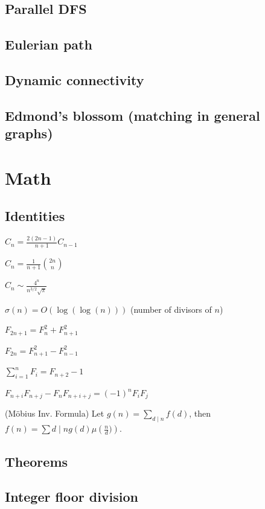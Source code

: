 \subsection{Parallel DFS}
\subsection{Eulerian path}
\subsection{Dynamic connectivity}
\subsection{Edmond's blossom (matching in general graphs)}

\section{Math}
\subsection{Identities}
{
$C_n = \frac{2(2n-1)}{n+1} C_{n-1}$

$C_n = \frac{1}{n+1} \binom{2n}{n}$

$C_n \sim \frac{4^n}{n^{3/2}\sqrt{\pi}}$

$\sigma(n) = O(\log(\log(n)))$ (number of divisors of $n$)

$F_{2n+1} = F_{n}^2 + F_{n+1}^2$

$F_{2n} = F_{n+1}^2 - F_{n-1}^2$

$\sum_{i=1}^n F_i = F_{n+2}-1$

$F_{n+i}F_{n+j} - F_nF_{n+i+j} = (-1)^n F_iF_j$

(Möbius Inv. Formula)
Let $g(n) = \sum_{d\mid n} f(d)$, then $f(n)=\sum{d\mid n} g(d) \mu\left(\frac{n}{d})\right)$.
}
\subsection{Theorems}
\subsection{Integer floor division}
